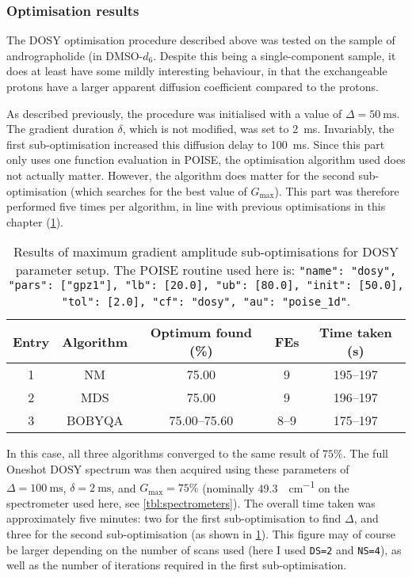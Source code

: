 \subsubsection{Optimisation results}

The DOSY optimisation procedure described above was tested on the sample of andrographolide (in DMSO-$d_6$.
Despite this being a single-component sample, it does at least have some mildly interesting behaviour, in that the exchangeable  protons have a larger apparent diffusion coefficient compared to the  protons.

As described previously, the procedure was initialised with a value of $\Delta = \qty{50}{\ms}$.
The gradient duration $\delta$, which is not modified, was set to \qty{2}{\ms}.
Invariably, the first sub-optimisation increased this diffusion delay to \qty{100}{\ms}.
Since this part only uses one function evaluation in POISE, the optimisation algorithm used does not actually matter.
However, the algorithm does matter for the second sub-optimisation (which searches for the best value of $G_\text{max}$).
This part was therefore performed five times per algorithm, in line with previous optimisations in this chapter (\cref{tbl:poise_dosy_opt2}).

\begin{table}[htb]
    \centering
    \begin{tabular}{ccccc}
        \toprule
        Entry & Algorithm & Optimum found (\%) & FEs  & Time taken (\unit{\s}) \\
        \midrule
        1     & NM        & 75.00              & 9    & 195--197             \\
        2     & MDS       & 75.00              & 9    & 196--197             \\
        3     & BOBYQA    & 75.00--75.60       & 8--9 & 175--197             \\
        \bottomrule
    \end{tabular}
    \caption[DOSY maximum gradient amplitude sub-optimisations]{
        Results of maximum gradient amplitude sub-optimisations for DOSY parameter setup.
        The POISE routine used here is: \texttt{{"name": "dosy", "pars": ["gpz1"], "lb": [20.0], "ub": [80.0], "init": [50.0], "tol": [2.0], "cf": "dosy", "au": "poise_1d"}}.
    }
    \label{tbl:poise_dosy_opt2}
\end{table}

In this case, all three algorithms converged to the same result of $75\%$.
The full Oneshot DOSY spectrum was then acquired using these parameters of $\Delta = \qty{100}{\ms}$, $\delta = \qty{2}{\ms}$, and $G_\text{max} = 75\%$ (nominally \qty{49.3}{\gauss\per\cm} on the spectrometer used here, see \cref{tbl:spectrometers}).
The overall time taken was approximately five minutes: two for the first sub-optimisation to find $\Delta$, and three for the second sub-optimisation (as shown in \cref{tbl:poise_dosy_opt2}).
This figure may of course be larger depending on the number of scans used (here I used \texttt{DS=2} and \texttt{NS=4}), as well as the number of iterations required in the first sub-optimisation.

